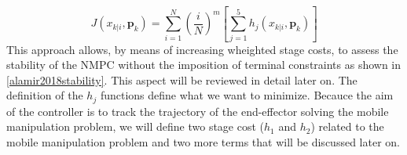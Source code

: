 \begin{equation} \label{costfunctionh}
J({x}_{k|i},\textbf{p}_k)=\sum_{i=1}^{N}\left(\frac{i}{N}\right)^m \left[ \sum_{j=1}^{5} h_j({x}_{k|i},\textbf{p}_k) \right]
\end{equation} 
This approach allows, by means of increasing wheighted stage costs, to assess the stability of the NMPC without the imposition of terminal constraints as shown in \ref{alamir2018stability}. This aspect will be reviewed in detail later on.
The definition of the $h_j$ functions define what we want to minimize. Becauce the aim of the controller is to track the trajectory of the end-effector solving the mobile manipulation problem, we will define two stage cost ($h_1$ and $h_2$) related to the mobile manipulation problem and two more terms that will be discussed later on.  

